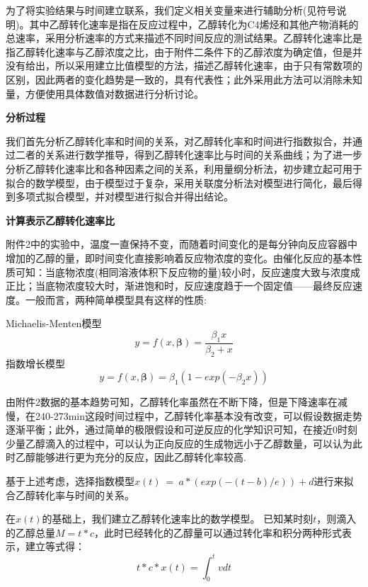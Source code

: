 \documentclass[withoutpreface,bwprint]{cumcmthesis} %
\begin{document}
为了将实验结果与时间建立联系，我们定义相关变量来进行辅助分析(见符号说明)。其中乙醇转化速率是指在反应过程中，乙醇转化为C4烯烃和其他产物消耗的总速率，采用分析速率的方式来描述不同时间反应的测试结果。乙醇转化速率比是指乙醇转化速率与乙醇浓度之比，由于附件二条件下的乙醇浓度为确定值，但是并没有给出，所以采用建立比值模型的方法，描述乙醇转化速率，由于只有常数项的区别，因此两者的变化趋势是一致的，具有代表性；此外采用此方法可以消除未知量，方便使用具体数值对数据进行分析讨论。

\textbf{分析过程}

我们首先分析乙醇转化率和时间的关系，对乙醇转化率和时间进行指数拟合，并通过二者的关系进行数学推导，得到乙醇转化速率比与时间的关系曲线；为了进一步分析乙醇转化速率比和各种因素之间的关系，利用量纲分析法，初步建立起可用于拟合的数学模型，由于模型过于复杂，采用关联度分析法对模型进行简化，最后得到多项式拟合模型，并对模型进行拟合并得出结论。

\textbf{计算表示乙醇转化速率比}

附件2中的实验中，温度一直保持不变，而随着时间变化的是每分钟向反应容器中增加的乙醇的量，即时间变化直接影响着反应物浓度的变化。由催化反应的基本性质可知：当底物浓度(相同溶液体积下反应物的量)较小时，反应速度大致与浓度成正比；当底物浓度较大时，渐进饱和时，反应速度趋于一个固定值——最终反应速度。一般而言，两种简单模型具有这样的性质:

Michaelis-Menten模型
\begin{equation*}
 y = f(x, \bm{\beta}) = \frac{\beta_1 x}{\beta_2 + x}
\end{equation*}
指数增长模型
\begin{equation*}
	y = f(x, \bm{\beta})  = \beta_1(1-exp(-\beta_2x))
\end{equation*}

由附件2数据的基本趋势可知，乙醇转化率虽然在不断下降，但是下降速率在减慢，在240-273min这段时间过程中，乙醇转化率基本没有改变，可以假设数据走势逐渐平衡；此外，通过简单的极限假设和可逆反应的化学知识可知，在接近0时刻少量乙醇滴入的过程中，可以认为正向反应的生成物远小于乙醇数量，可以认为此时乙醇能够进行更为充分的反应，因此乙醇转化率较高.

基于上述考虑，选择指数模型$x(t)\ =\ a\ast(exp(-(t-b)/e))+d$进行来拟合乙醇转化率与时间的关系。

在$x(t)$的基础上，我们建立乙醇转化速率比的数学模型。
已知某时刻$t$，则滴入的乙醇总量$M=t*c$，此时已经转化的乙醇量可以通过转化率和积分两种形式表示，建立等式得：
\begin{equation}
t\ast c\ast x(t)=\int_{0}^{t}vdt
\end{equation}
\end{document}
